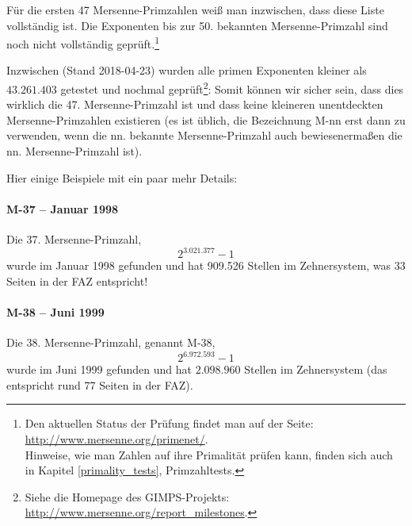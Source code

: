 \begin{refsegment}
Für die ersten 47  %
Mersenne-Primzahlen weiß man inzwischen, dass diese Liste vollständig ist.
Die Exponenten bis zur 50.  %
bekannten Mersenne-Primzahl sind noch nicht vollständig geprüft.\footnote{%
Den aktuellen Status der Prüfung findet man auf der Seite:
      \url{http://www.mersenne.org/primenet/}.\\
Hinweise, wie man Zahlen auf ihre Primalität prüfen kann, finden sich auch
in Kapitel \ref{primality_tests}, Primzahltests.      }


Inzwischen (Stand 2018-04-23) wurden alle primen Exponenten kleiner als
$ 43.261.403 $ getestet und nochmal geprüft\footnote{%
Siehe die Homepage des GIMPS-Projekts:
      \url{http://www.mersenne.org/report_milestones}.
  }:
Somit können wir sicher sein, dass dies wirklich
die 47. Mersenne-Primzahl ist und dass keine kleineren unentdeckten
Mersenne-Primzahlen existieren (es ist üblich, die Bezeichnung M-nn erst dann
zu verwenden, wenn die nn. bekannte Mersenne-Primzahl auch bewiesenermaßen die
nn. Mersenne-Primzahl ist).

Hier einige Beispiele mit ein paar mehr Details:

\paragraph*{M-37 -- Januar 1998} \mbox{}

Die 37. Mersenne-Primzahl, $$2^{3.021.377} - 1 $$
wurde im Januar 1998 gefunden und hat
909.526 Stellen im Zehnersystem, was 33 Seiten in der FAZ entspricht!


\paragraph*{M-38 -- Juni 1999}\mbox{}

Die 38. Mersenne-Primzahl, genannt M-38, $$ 2^{6.972.593} - 1 $$
wurde im Juni 1999 gefunden und hat $2.098.960$ Stellen im
Zehnersystem (das entspricht rund 77 Seiten in der FAZ).


\hypertarget{M-39}{}

\end{refsegment}
